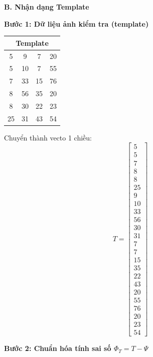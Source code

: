 \textbf{B. Nhận dạng Template}

\textbf{Bước 1: Dữ liệu ảnh kiểm tra (template)}

\begin{table}[H]
\centering
\begin{tabular}{|c|c|c|c|}
\hline
\multicolumn{4}{|c|}{Template} \\
\hline
5 & 9 & 7 & 20 \\
\hline
5 & 10 & 7 & 55 \\
\hline
7 & 33 & 15 & 76 \\
\hline
8 & 56 & 35 & 20 \\
\hline
8 & 30 & 22 & 23 \\
\hline
25 & 31 & 43 & 54 \\
\hline
\end{tabular}
\end{table}

Chuyển thành vecto 1 chiều:
\[
T = \begin{bmatrix}
5 \\
5 \\
7 \\
8 \\
8 \\
25 \\
9 \\
10 \\
33 \\
56 \\
30 \\
31 \\
7 \\
7 \\
15 \\
35 \\
22 \\
43 \\
20 \\
55 \\
76 \\
20 \\
23 \\
54
\end{bmatrix}
\]

\textbf{Bước 2: Chuẩn hóa tính sai số $\Phi_T = T - \Psi$}

